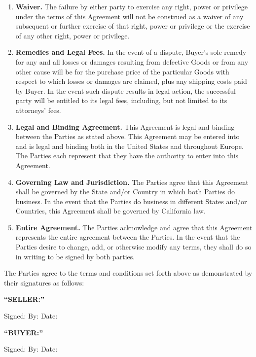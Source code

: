 \documentclass[letterpaper]{article}
\newcommand{\blank}[1]{\underline{\hspace{#1}}}
\begin{document}
\begin{enumerate}
        \item \textbf{Waiver.} The failure by either party to exercise any right, power or privilege under the terms of this Agreement will not be construed as a waiver of any subsequent or further exercise of that right, power or privilege or the exercise of any other right, power or privilege. 

        \item \textbf{Remedies and Legal Fees.} In the event of a dispute, Buyer’s sole remedy for any and all losses or damages resulting from defective Goods or from any other cause will be for the purchase price of the particular Goods with respect to which losses or damages are claimed, plus any shipping costs paid by Buyer. In the event such dispute results in legal action, the successful party will be entitled to its legal fees, including, but not limited to its attorneys’ fees.

        \item \textbf{Legal and Binding Agreement.} This Agreement is legal and binding between the Parties as stated above. This Agreement may be entered into and is legal and binding both in the United States and throughout Europe. The Parties each represent that they have the authority to enter into this Agreement.

        \item \textbf{Governing Law and Jurisdiction.} The Parties agree that this Agreement shall be governed by the State and/or Country in which both Parties do business. In the event that the Parties do business in different States and/or Countries, this Agreement shall be governed by California law.

        \item \textbf{Entire Agreement.} The Parties acknowledge and agree that this Agreement represents the entire agreement between the Parties. In the event that the Parties desire to change, add, or otherwise modify any terms, they shall do so in writing to be signed by both parties.
    \end{enumerate}

    The Parties agree to the terms and conditions set forth above as demonstrated by their signatures as follows:

    \textbf{``SELLER:''}

    Signed: \blank{3cm} By: \blank{3cm} Date: \blank{3cm}

    \textbf{``BUYER:''}

    Signed: \blank{3cm} By: \blank{3cm} Date: \blank{3cm}
\end{document}

